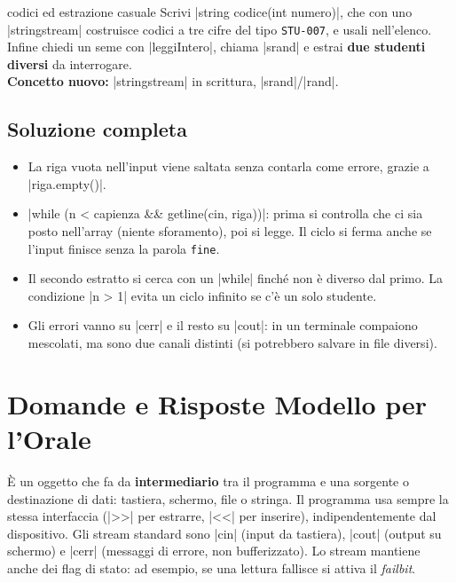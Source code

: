 \begin{step}{codici ed estrazione casuale}
Scrivi \cc|string codice(int numero)|, che con uno \cc|stringstream| costruisce
codici a tre cifre del tipo \texttt{STU-007}, e usali nell'elenco. Infine chiedi
un seme con \cc|leggiIntero|, chiama \cc|srand| e estrai \textbf{due studenti
diversi} da interrogare.\\[0.3em]
\textbf{Concetto nuovo:} \cc|stringstream| in scrittura, \cc|srand|/\cc|rand|.
\end{step}

\subsection*{Soluzione completa}

\begin{consiglio}
\begin{itemize}
  \item La riga vuota nell'input viene saltata senza contarla come errore,
        grazie a \cc|riga.empty()|.
  \item \cc|while (n < capienza && getline(cin, riga))|: prima si controlla che
        ci sia posto nell'array (niente sforamento), poi si legge. Il ciclo si
        ferma anche se l'input finisce senza la parola \texttt{fine}.
  \item Il secondo estratto si cerca con un \cc|while| finché non è diverso dal
        primo. La condizione \cc|n > 1| evita un ciclo infinito se c'è un solo studente.
  \item Gli errori vanno su \cc|cerr| e il resto su \cc|cout|: in un terminale
        compaiono mescolati, ma sono due canali distinti (si potrebbero salvare
        in file diversi).
\end{itemize}
\end{consiglio}

\section{Domande e Risposte Modello per l'Orale}

\begin{orale}
È un oggetto che fa da \textbf{intermediario} tra il programma e una sorgente o
destinazione di dati: tastiera, schermo, file o stringa. Il programma usa sempre
la stessa interfaccia (\cc|>>| per estrarre, \cc|<<| per inserire),
indipendentemente dal dispositivo. Gli stream standard sono \cc|cin| (input da
tastiera), \cc|cout| (output su schermo) e \cc|cerr| (messaggi di errore, non
bufferizzato). Lo stream mantiene anche dei flag di stato: ad esempio, se una
lettura fallisce si attiva il \emph{failbit}.
\end{orale}


